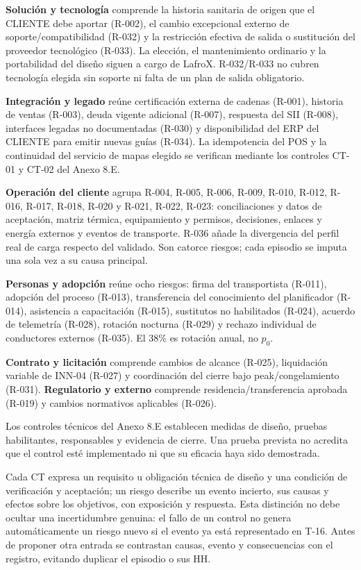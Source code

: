 
\textbf{Solución y tecnología} comprende la historia sanitaria de origen que el CLIENTE debe aportar (R-002), el cambio excepcional externo de soporte/compatibilidad (R-032) y la restricción efectiva de salida o sustitución del proveedor tecnológico (R-033). La elección, el mantenimiento ordinario y la portabilidad del diseño siguen a cargo de LafroX. R-032/R-033 no cubren tecnología elegida sin soporte ni falta de un plan de salida obligatorio.

\textbf{Integración y legado} reúne certificación externa de cadenas (R-001), historia de ventas (R-003), deuda vigente adicional (R-007), respuesta del SII (R-008), interfaces legadas no documentadas (R-030) y disponibilidad del ERP del CLIENTE para emitir nuevas guías (R-034). La idempotencia del POS y la continuidad del servicio de mapas elegido se verifican mediante los controles CT-01 y CT-02 del Anexo 8.E.

\textbf{Operación del cliente} agrupa R-004, R-005, R-006, R-009, R-010, R-012, R-016, R-017, R-018, R-020 y R-021, R-022, R-023: conciliaciones y datos de aceptación, matriz térmica, equipamiento y permisos, decisiones, enlaces y energía externos y eventos de transporte. R-036 añade la divergencia del perfil real de carga respecto del validado. Son catorce riesgos; cada episodio se imputa una sola vez a su causa principal.

\textbf{Personas y adopción} reúne ocho riesgos: firma del transportista (R-011), adopción del proceso (R-013), transferencia del conocimiento del planificador (R-014), asistencia a capacitación (R-015), sustitutos no habilitados (R-024), acuerdo de telemetría (R-028), rotación nocturna (R-029) y rechazo individual de conductores externos (R-035). El 38\% es rotación anual, no $p_0$.

\textbf{Contrato y licitación} comprende cambios de alcance (R-025), liquidación variable de INN-04 (R-027) y coordinación del cierre bajo peak/congelamiento (R-031). \textbf{Regulatorio y externo} comprende residencia/transferencia aprobada (R-019) y cambios normativos aplicables (R-026).

Los controles técnicos del Anexo 8.E establecen medidas de diseño, pruebas habilitantes, responsables y evidencia de cierre. Una prueba prevista no acredita que el control esté implementado ni que su eficacia haya sido demostrada.

Cada CT expresa un requisito u obligación técnica de diseño y una condición de verificación y aceptación; un riesgo describe un evento incierto, sus causas y efectos sobre los objetivos, con exposición y respuesta. Esta distinción no debe ocultar una incertidumbre genuina: el fallo de un control no genera automáticamente un riesgo nuevo si el evento ya está representado en T-16. Antes de proponer otra entrada se contrastan causas, evento y consecuencias con el registro, evitando duplicar el episodio o sus HH.

